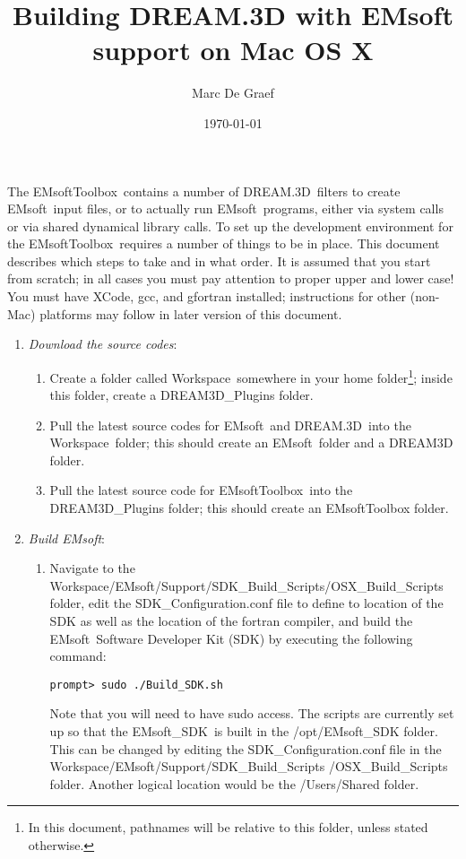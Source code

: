 \documentclass[11pt]{amsart}
\title{Building DREAM.3D with EMsoft support on Mac OS X}
\author{Marc De Graef}
\date{\today}                                           %
\newcommand{\ems}{\textsf{EMsoft}}
\newcommand{\emsdk}{\textsf{EMsoft\_SDK}}
\newcommand{\dtd}{\textsf{DREAM.3D}}
\newcommand{\emtb}{\textsf{EMsoftToolbox}}
\newcommand{\ws}{\textsf{Workspace}}
\newcommand{\wsesh}{\textsf{Workspace/EMsoft/Support/SDK\_Build\_Scripts}}
\begin{document}
\maketitle
The \emtb\ contains a number of \dtd\ filters to create \ems\ input files, or to actually
run \ems\ programs, either via system calls or via shared dynamical library calls.  To set up the development
environment for the \emtb\ requires a number of things to be in place.  This document describes which steps to take and in 
what order.  It is assumed that you start from scratch; in all cases you must pay attention to proper upper and lower case!
You must have XCode, gcc, and gfortran installed; instructions for other (non-Mac) platforms may follow in  later version
of this document.

\begin{enumerate}
\item \textit{Download the source codes}:
\begin{enumerate}
\item Create a folder called \ws\ somewhere in your home folder\footnote{In this document, pathnames will be relative to 
this folder, unless stated otherwise.}; inside this folder, create a \textsf{DREAM3D\_Plugins} folder.
\item Pull the latest source codes for \ems\ and \dtd\ into the \ws\ folder; this should create an \ems\ folder and a \textsf{DREAM3D} folder.
\item Pull the latest source code for \emtb\ into the \textsf{DREAM3D\_Plugins} folder; this should create an \textsf{EMsoftToolbox} folder.
\end{enumerate}
\item \textit{Build \ems}:
\begin{enumerate}
\item Navigate to the \wsesh\textsf{/OSX\_Build\_Scripts} folder, edit the \textsf{SDK\_Configuration.conf} file to define 
to location of the SDK as well as the location of the fortran compiler, and build the \ems\ Software Developer Kit (SDK) by executing the following command:
{\small\begin{verbatim}prompt> sudo ./Build_SDK.sh
\end{verbatim}}
Note that you will need to have sudo access.  The scripts are currently set up so that the \emsdk\ is built in the 
\textsf{/opt/EMsoft\_SDK} folder.  This can be changed by editing the \textsf{SDK\_Configuration.conf} file in the \wsesh\/ \textsf{/OSX\_Build\_Scripts} folder.  
Another logical location would be the \textsf{/Users/Shared} folder.


\end{enumerate}
\end{enumerate}
\end{document}
